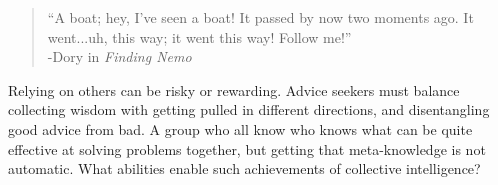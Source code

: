 \documentclass[12pt,letterpaper]{article}
\begin{document}









\begin{quote}``A boat; hey, I've seen a boat! It passed by now two moments ago. It went...uh, this way; it went this way! Follow me!''\\
-Dory in \textit{Finding Nemo}
\end{quote}

Relying on others can be risky or rewarding. Advice seekers must balance collecting wisdom with getting pulled in different directions, and disentangling good advice from bad. %
A group who all know who knows what can be quite effective at solving problems together, but getting that meta-knowledge is not automatic. What abilities enable such achievements of collective intelligence?









 

\end{document}
